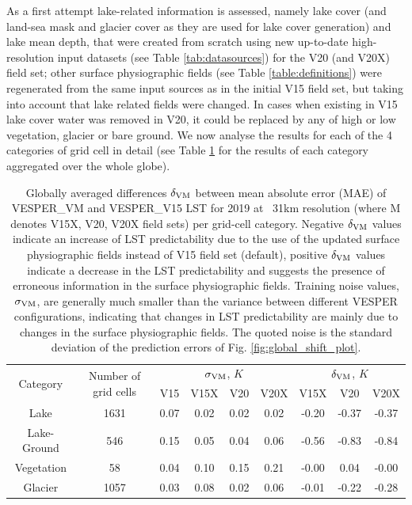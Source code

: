 \documentclass[hess, twostagejnl]{copernicus}
\begin{document}
As a first attempt lake-related information is assessed, namely lake cover (and land-sea mask and glacier cover as they are used for lake cover generation) and lake mean depth, that were created from scratch using new up-to-date high-resolution input datasets (see Table \ref{tab:datasources}) for the V20 (and V20X) field set; other surface physiographic fields (see Table \ref{table:definitions}) were regenerated from the same input sources as in the initial V15 field set, but taking into account that lake related fields were changed. In cases when existing in V15 lake cover water was removed in V20, it could be replaced by any of high or low vegetation, glacier or bare ground. We now analyse the results for each of the 4 categories of grid cell in detail (see Table \ref{tab:categorisation} for the results of each category aggregated over the whole globe).
\begin{table}
	\begin{tabular}{ccccccccc}
		\toprule
		\multirow{2}{*}{Category} & \multirow{2}{*}{Number of grid cells} & 	\multicolumn{4}{c}{$\sigma_{\rm VM}$, $K$} &\multicolumn{3}{c}{$\delta_{\rm VM}$, $K$} \\  
		&&V15  & V15X & V20 & V20X & V15X &V20 & V20X  \\
		\hline 
		Lake&1631 & 0.07& 0.02& 0.02& 0.02&  -0.20 & -0.37&-0.37 \\
		Lake-Ground&546 & 0.15 &0.05& 0.04& 0.06 & -0.56 &-0.83& -0.84 \\
		Vegetation&58 & 0.04 &0.10& 0.15& 0.21&  -0.00&0.04 & -0.00 \\
		Glacier&1057 & 0.03& 0.08& 0.02& 0.06 & -0.01& -0.22& -0.28  \\
		\bottomrule
	\end{tabular}
	\caption{Globally averaged differences $\delta_{\rm VM}$ between mean absolute error (MAE) of VESPER\_VM  and VESPER\_V15 LST for 2019 at ~31km resolution (where M denotes V15X, V20, V20X field sets) per grid-cell category. Negative $\delta_{\rm VM}$ values indicate an increase of LST predictability due to the use of the updated surface physiographic fields instead of V15 field set (default), positive $\delta_{\rm VM}$ values indicate a decrease in the LST predictability and suggests the presence of erroneous information in the surface physiographic fields. Training noise values, $\sigma_{\rm VM}$, are generally much smaller than the variance between different VESPER configurations, indicating that changes in LST predictability are mainly due to changes in the surface physiographic fields. The quoted noise is the standard deviation of the prediction errors of Fig. \ref{fig:global_shift_plot}.}
	\label{tab:categorisation}
\end{table}	
\end{document}
